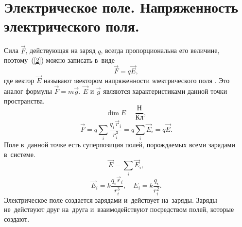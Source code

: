 \section{Электрическое поле. Напряженность \,\, электрического поля.}

	Сила $\vec{F}$, действующая на заряд $q$, всегда пропорциональна его величине, поэтому~(\ref{2}) можно записать в~виде
		\begin{equation}
			\vec{F} = q\vec{E},
		\end{equation}
	где вектор $\vec{E}$ называют \i{вектором напряженности электрического поля} . Это аналог формулы $\vec{F}=m\vec{g}$. $\vec{E}$ и $\vec{g}$ являются характеристиками данной точки пространства.
		$$\dim{E}=\frac{\text{Н}}{\text{Кл}},$$
		$$\vec{F}=q\sum_i \frac{q_i\vec{r}_i}{r_i^3}=q\sum_i \vec{E}_i=q\vec{E}.$$
	Поле  в~данной точке есть суперпозиция  полей, порождаемых всеми зарядами в~системе.
		$$\vec{E}=\sum_i \vec{E}_i,$$
		$$\vec{E}_i=k\frac{q_i\vec{r}_i}{r_i^3}, \quad E_i = k\frac{q_i}{r_i^2}.$$
	Электрическое поле создается зарядами и~действует на~заряды. Заряды не~действуют друг на~друга и~взаимодействуют посредством полей, которые создают.